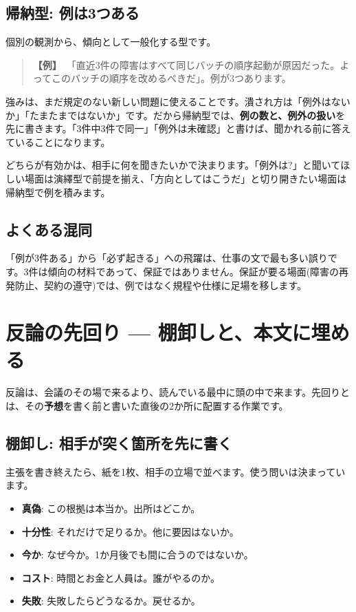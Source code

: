 \documentclass{article}
\begin{document}
\subsection{帰納型: 例は3つある}

個別の観測から、傾向として一般化する型です。

\begin{quote}
\textbf{【例】}\ 「直近3件の障害はすべて同じバッチの順序起動が原因だった。よってこのバッチの順序を改めるべきだ」。例が3つあります。
\end{quote}

強みは、まだ規定のない新しい問題に使えることです。潰され方は「例外はないか」「たまたまではないか」です。だから帰納型では、\textbf{例の数と、例外の扱い}を先に書きます。「3件中3件で同一」「例外は未確認」と書けば、聞かれる前に答えていることになります。

どちらが有効かは、相手に何を聞きたいかで決まります。「例外は?」と聞いてほしい場面は演繹型で前提を揃え、「方向としてはこうだ」と切り開きたい場面は帰納型で例を積みます。

\subsection{よくある混同}

「例が3件ある」から「必ず起きる」への飛躍は、仕事の文で最も多い誤りです。3件は傾向の材料であって、保証ではありません。保証が要る場面(障害の再発防止、契約の遵守)では、例ではなく規程や仕様に足場を移します。

\section{反論の先回り — 棚卸しと、本文に埋める}

反論は、会議のその場で来るより、読んでいる最中に頭の中で来ます。先回りとは、その\textbf{予想}を書く前と書いた直後の2か所に配置する作業です。

\subsection{棚卸し: 相手が突く箇所を先に書く}

主張を書き終えたら、紙を1枚、相手の立場で並べます。使う問いは決まっています。

\begin{itemize}
\item \textbf{真偽}: この根拠は本当か。出所はどこか。
\item \textbf{十分性}: それだけで足りるか。他に要因はないか。
\item \textbf{今か}: なぜ今か。1か月後でも間に合うのではないか。
\item \textbf{コスト}: 時間とお金と人員は。誰がやるのか。
\item \textbf{失敗}: 失敗したらどうなるか。戻せるか。
\end{itemize}
\end{document}
